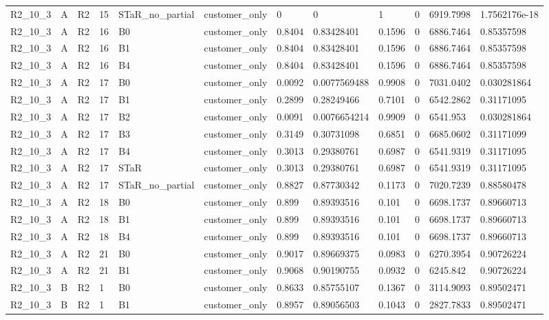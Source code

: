 \begin{longtable}{llllllllllll}
R2\_10\_3 & A & R2 & 15 & STaR\_no\_partial & customer\_only & 0 & 0 & 1 & 0 & 6919.7998 & 1.7562176e-18 \\
R2\_10\_3 & A & R2 & 16 & B0 & customer\_only & 0.8404 & 0.83428401 & 0.1596 & 0 & 6886.7464 & 0.85357598 \\
R2\_10\_3 & A & R2 & 16 & B1 & customer\_only & 0.8404 & 0.83428401 & 0.1596 & 0 & 6886.7464 & 0.85357598 \\
R2\_10\_3 & A & R2 & 16 & B4 & customer\_only & 0.8404 & 0.83428401 & 0.1596 & 0 & 6886.7464 & 0.85357598 \\
R2\_10\_3 & A & R2 & 17 & B0 & customer\_only & 0.0092 & 0.0077569488 & 0.9908 & 0 & 7031.0402 & 0.030281864 \\
R2\_10\_3 & A & R2 & 17 & B1 & customer\_only & 0.2899 & 0.28249466 & 0.7101 & 0 & 6542.2862 & 0.31171095 \\
R2\_10\_3 & A & R2 & 17 & B2 & customer\_only & 0.0091 & 0.0076654214 & 0.9909 & 0 & 6541.953 & 0.030281864 \\
R2\_10\_3 & A & R2 & 17 & B3 & customer\_only & 0.3149 & 0.30731098 & 0.6851 & 0 & 6685.0602 & 0.31171099 \\
R2\_10\_3 & A & R2 & 17 & B4 & customer\_only & 0.3013 & 0.29380761 & 0.6987 & 0 & 6541.9319 & 0.31171095 \\
R2\_10\_3 & A & R2 & 17 & STaR & customer\_only & 0.3013 & 0.29380761 & 0.6987 & 0 & 6541.9319 & 0.31171095 \\
R2\_10\_3 & A & R2 & 17 & STaR\_no\_partial & customer\_only & 0.8827 & 0.87730342 & 0.1173 & 0 & 7020.7239 & 0.88580478 \\
R2\_10\_3 & A & R2 & 18 & B0 & customer\_only & 0.899 & 0.89393516 & 0.101 & 0 & 6698.1737 & 0.89660713 \\
R2\_10\_3 & A & R2 & 18 & B1 & customer\_only & 0.899 & 0.89393516 & 0.101 & 0 & 6698.1737 & 0.89660713 \\
R2\_10\_3 & A & R2 & 18 & B4 & customer\_only & 0.899 & 0.89393516 & 0.101 & 0 & 6698.1737 & 0.89660713 \\
R2\_10\_3 & A & R2 & 21 & B0 & customer\_only & 0.9017 & 0.89669375 & 0.0983 & 0 & 6270.3954 & 0.90726224 \\
R2\_10\_3 & A & R2 & 21 & B1 & customer\_only & 0.9068 & 0.90190755 & 0.0932 & 0 & 6245.842 & 0.90726224 \\
R2\_10\_3 & B & R2 & 1 & B0 & customer\_only & 0.8633 & 0.85755107 & 0.1367 & 0 & 3114.9093 & 0.89502471 \\
R2\_10\_3 & B & R2 & 1 & B1 & customer\_only & 0.8957 & 0.89056503 & 0.1043 & 0 & 2827.7833 & 0.89502471 \\

\end{longtable}
